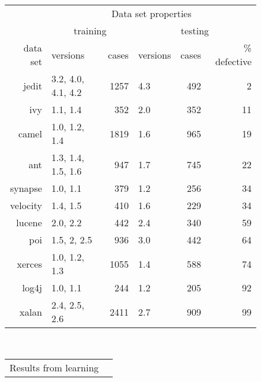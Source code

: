 \begin{figure*}[hbtp!]
	\small
	\begin{center}
		\begin{minipage}{.46\linewidth}
			\begin{tabular}{r@{~}|l@{~}|r@{~}|l@{~}|r@{~}|r@{~}|} \cline{2-6}
			 
				
				& \multicolumn{5}{c|}{ Data set  properties}\\ 
			 
				& \multicolumn{2}{c|}{training}   & \multicolumn{3}{c|}{testing}      \\ \cline{2-6}
				data set      & versions           & cases & versions     & cases    & \% defective             \\ \hline
				jedit    & 3.2, 4.0, 4.1, 4.2 & 1257      & 4.3          & 492          & 2 \\
				ivy      & 1.1, 1.4           & 352       & 2.0          & 352          & 11 \\
				camel    & 1.0, 1.2, 1.4      & 1819      & 1.6          & 965          & 19 \\
				ant      & 1.3, 1.4, 1.5, 1.6 & 947       & 1.7          & 745          & 22 \\
				synapse  & 1.0, 1.1           & 379       & 1.2          & 256          & 34 \\
				velocity & 1.4, 1.5           & 410       & 1.6          & 229          & 34 \\
				lucene   & 2.0, 2.2           & 442       & 2.4          & 340          & 59 \\
				poi      & 1.5, 2, 2.5        & 936       & 3.0          & 442          & 64 \\
			 xerces   & 1.0, 1.2, 1.3      & 1055      & 1.4          & 588          & 74  \\ 
			 log4j    & 1.0, 1.1           & 244       & 1.2          & 205          & 92   \\
			 xalan    & 2.4, 2.5, 2.6      & 2411      & 2.7          & 909          & 99  \\\hline 
				
				
			\end{tabular}\end{minipage}~~~~~~\begin{minipage}{.4\linewidth}
			\begin{tabular}{|rrr|rrr|rr|l} \cline{1-8}
			 
				\multicolumn{8}{|c|}{  Results from learning}\\
			 

\end{tabular}
\end{minipage}
\end{center}
\end{figure*}
